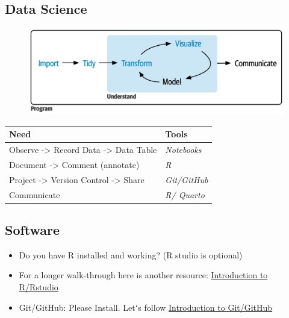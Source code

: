 \documentclass[
  letterpaper,
  DIV=11,
  numbers=noendperiod]{scrartcl}
\providecommand{\tightlist}{%
  \setlength{\itemsep}{0pt}\setlength{\parskip}{0pt}}\usepackage{longtable,booktabs,array}
\begin{document}
\hypertarget{data-science-1}{%
\subsection{Data Science}\label{data-science-1}}

\begin{figure}

{\centering 

\href{https://r4ds.hadley.nz/whole-game.html}{\includegraphics{whole-game.png}}

}

\end{figure}

\begin{longtable}[]{@{}ll@{}}
\toprule()
Need & Tools \\
\midrule()
\endhead
Observe -\textgreater{} Record Data -\textgreater{} Data Table &
\emph{Notebooks} \\
Document -\textgreater{} Comment (annotate) & \emph{R} \\
Project -\textgreater{} Version Control -\textgreater{} Share &
\emph{Git/GitHub} \\
Communicate & \emph{R/ Quarto} \\
\bottomrule()
\end{longtable}

\hypertarget{software}{%
\subsection{Software}\label{software}}

\begin{itemize}
\tightlist
\item
  Do you have R installed and working? (R studio is optional)
\item
  For a longer walk-through here is another resource:
  \href{https://www.stephaniehicks.com/jhustatcomputing2022/posts/2022-08-30-introduction-to-r-and-rstudio/}{Introduction
  to R/Rstudio}
\item
  Git/GitHub: Please Install. Letʻs follow
  \href{https://www.stephaniehicks.com/jhustatcomputing2022/posts/2022-08-30-introduction-to-gitgithub/}{Introduction
  to Git/GitHub}
\end{itemize}
\end{document}
